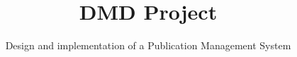\documentclass{acm_proc_article-sp}
\begin{document}
\title{{\ttlit DMD} Project}
\subtitle{Design and implementation of a Publication Management System}
%
%
%
%
%
\end{document}
